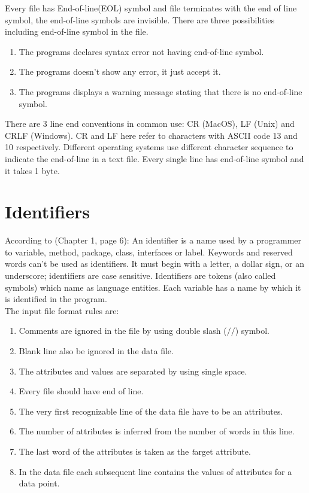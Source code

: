 \documentclass{report}
\begin{document}
Every file has End-of-line(EOL) symbol and file terminates with the end of line symbol, the end-of-line symbols are invisible.
There are three possibilities including end-of-line symbol in the file.
\begin{enumerate}

\item The programs declares syntax error not having end-of-line symbol.
\item The programs doesn't show any error, it just accept it.
\item The programs displays a warning message stating that there is no end-of-line symbol.

\end{enumerate}

There are 3 line end conventions in common use: CR (MacOS), LF (Unix) and CRLF (Windows). CR 
and LF here refer to characters with ASCII code 13 and 10 respectively. 
Different operating systems use different character sequence to indicate the end-of-line in a text file.
Every single line has end-of-line symbol and it takes 1 byte.


\section{Identifiers}
\label{sec:ide}

According to \cite{Roberts2000CompleteJava2Certification}(Chapter 1, page 6): An identifier is a name used by a programmer to variable, method, package, class, interfaces or label. Keywords and reserved words can't be used as  identifiers. It must begin with a letter, a dollar sign, or an underscore; identifiers are case sensitive. Identifiers are tokens (also called symbols) which name as language entities. Each variable has a name by which it is identified in the program.\\

The input file format rules are:
\begin{enumerate}

\item Comments are ignored in the file by using double slash ($//$) symbol. 
\item Blank line also be ignored in the data file.
\item The attributes and values are separated by using single space.
\item Every file should have end of line.
\item The very first recognizable line of the data file have to be an attributes.
\item The number of attributes is inferred from the number of words in this line.
\item The last word of the attributes is taken as the {\emph target attribute. }
\item In the data file each subsequent line contains the values of attributes for a data point.


\end{enumerate}
\end{document}
